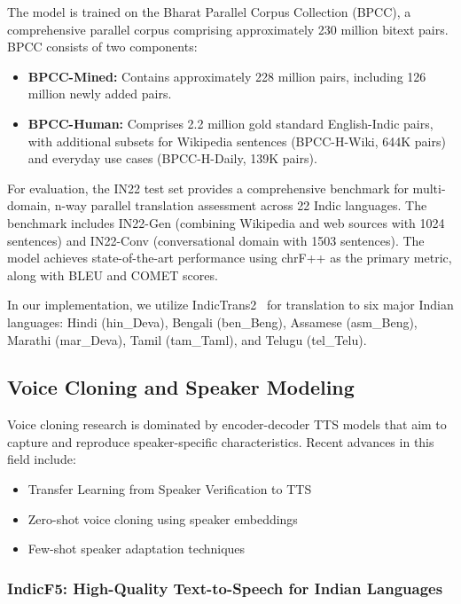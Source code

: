 \documentclass[12pt,oneside]{report}
\begin{document}
The model is trained on the Bharat Parallel Corpus Collection (BPCC), a comprehensive parallel corpus comprising approximately 230 million bitext pairs. BPCC consists of two components:
\begin{itemize}
    \item \textbf{BPCC-Mined:} Contains approximately 228 million pairs, including 126 million newly added pairs.
    \item \textbf{BPCC-Human:} Comprises 2.2 million gold standard English-Indic pairs, with additional subsets for Wikipedia sentences (BPCC-H-Wiki, 644K pairs) and everyday use cases (BPCC-H-Daily, 139K pairs).
\end{itemize}

For evaluation, the IN22 test set provides a comprehensive benchmark for multi-domain, n-way parallel translation assessment across 22 Indic languages. The benchmark includes IN22-Gen (combining Wikipedia and web sources with 1024 sentences) and IN22-Conv (conversational domain with 1503 sentences). The model achieves state-of-the-art performance using chrF++ as the primary metric, along with BLEU and COMET scores.

In our implementation, we utilize IndicTrans2~\cite{gala2023indictrans2} for translation to six major Indian languages: Hindi (hin\_Deva), Bengali (ben\_Beng), Assamese (asm\_Beng), Marathi (mar\_Deva), Tamil (tam\_Taml), and Telugu (tel\_Telu).

\subsection{Voice Cloning and Speaker Modeling}

Voice cloning research is dominated by encoder-decoder TTS models that aim to capture and reproduce speaker-specific characteristics. Recent advances in this field include:
\begin{itemize}
    \item Transfer Learning from Speaker Verification to TTS
    \item Zero-shot voice cloning using speaker embeddings
    \item Few-shot speaker adaptation techniques
\end{itemize}

\subsubsection{IndicF5: High-Quality Text-to-Speech for Indian Languages}
\end{document}

